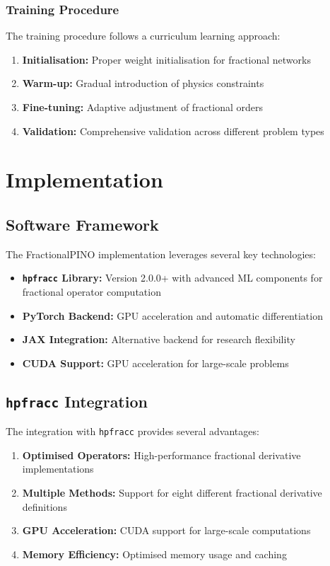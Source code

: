 \documentclass[12pt,a4paper]{article}
\theoremstyle{definition}
\begin{document}
\subsubsection{Training Procedure}

The training procedure follows a curriculum learning approach:

\begin{enumerate}
    \item \textbf{Initialisation:} Proper weight initialisation for fractional networks
    \item \textbf{Warm-up:} Gradual introduction of physics constraints
    \item \textbf{Fine-tuning:} Adaptive adjustment of fractional orders
    \item \textbf{Validation:} Comprehensive validation across different problem types
\end{enumerate}

\section{Implementation}
\label{sec:implementation}

\subsection{Software Framework}

The FractionalPINO implementation leverages several key technologies:

\begin{itemize}
    \item \textbf{\texttt{hpfracc} Library:} Version 2.0.0+ with advanced ML components for fractional operator computation
    \item \textbf{PyTorch Backend:} GPU acceleration and automatic differentiation
    \item \textbf{JAX Integration:} Alternative backend for research flexibility
    \item \textbf{CUDA Support:} GPU acceleration for large-scale problems
\end{itemize}

\subsection{\texttt{hpfracc} Integration}

The integration with \texttt{hpfracc} provides several advantages:

\begin{enumerate}
    \item \textbf{Optimised Operators:} High-performance fractional derivative implementations
    \item \textbf{Multiple Methods:} Support for eight different fractional derivative definitions
    \item \textbf{GPU Acceleration:} CUDA support for large-scale computations
    \item \textbf{Memory Efficiency:} Optimised memory usage and caching
\end{enumerate}
\end{document}
